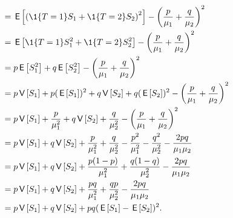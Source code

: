 \begin{extra}
\begin{solution}
\begin{align*}
&= \E{\left(\1{T=1} S_1 + \1{T=2} S_2\right)^2} - \left(\frac{p}{\mu_1}+\frac{q}{\mu_2}\right)^2 \\
&= \E{\1{T=1} S_1^2 + \1{T=2} S_2^2} - \left(\frac{p}{\mu_1}+\frac{q}{\mu_2}\right)^2 \\ 
&= p \E{S_1^2} + q \E{S_2^2} - \left(\frac{p}{\mu_1}+\frac{q}{\mu_2}\right)^2 \\ 
&= p \V{S_1} + p (\E{S_1})^2 + q \V{S_2} + q(\E{ S_2})^2 - \left(\frac{p}{\mu_1}+\frac{q}{\mu_2}\right)^2 \\ 
&= p \V{S_1} + \frac{p}{\mu_1^2} + q \V{S_2} + \frac{q}{\mu_2^2} - \left(\frac{p}{\mu_1}+\frac{q}{\mu_2}\right)^2 \\ 
&= p \V{S_1} + q \V{S_2}
+ \frac{p}{\mu_1^2} + \frac{q}{\mu_2^2}
- \frac{p^2}{\mu_1^2}-\frac{q^2}{\mu_2^2}  -\frac{2pq}{\mu_1\mu_2}\\ 
&= p \V{S_1} + q \V{S_2}
+ \frac{p(1-p)}{\mu_1^2} + \frac{q(1-q)}{\mu_2^2}
-\frac{2pq}{\mu_1\mu_2}\\ 
&= p \V{S_1} + q \V{S_2}
+ \frac{pq}{\mu_1^2} + \frac{qp}{\mu_2^2}
-\frac{2pq}{\mu_1\mu_2}\\ 
&= p \V{S_1} + q \V{S_2}
+ pq(\E{S_1} - \E{S_2})^2.
\end{align*}
\end{solution}
\end{extra}








